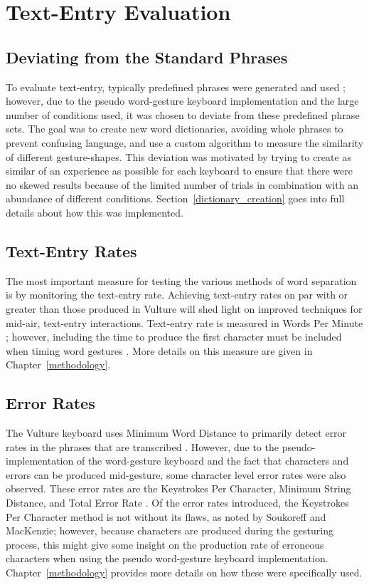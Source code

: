 \section{Text-Entry Evaluation}

\subsection{Deviating from the Standard Phrases}
To evaluate text-entry, typically predefined phrases were generated and used \cite{ref_phrase_sets}; however, due to the pseudo word-gesture keyboard implementation and the large number of conditions used, it was chosen to deviate from these predefined phrase sets. The goal was to create new word dictionaries, avoiding whole phrases to prevent confusing language, and use a custom algorithm to measure the similarity of different gesture-shapes. This deviation was motivated by trying to create as similar of an experience as possible for each keyboard to ensure that there were no skewed results because of the limited number of trials in combination with an abundance of different conditions. Section~\ref{dictionary_creation} goes into full details about how this was implemented.

\subsection{Text-Entry Rates}
The most important measure for testing the various methods of word separation is by monitoring the text-entry rate. Achieving text-entry rates on par with or greater than those produced in Vulture will shed light on improved techniques for mid-air, text-entry interactions. Text-entry rate is measured in Words Per Minute \cite{ref_wpm_word_gesture_formula}; however, including the time to produce the first character must be included when timing word gestures \cite{ref_wpm_word_gesture_timing}. More details on this measure are given in Chapter~\ref{methodology}.

\subsection{Error Rates}
The Vulture keyboard uses Minimum Word Distance to primarily detect error rates in the phrases that are transcribed \cite{ref_vulture}. However, due to the pseudo-implementation of the word-gesture keyboard and the fact that characters and errors can be produced mid-gesture, some character level error rates were also observed. These error rates are the Keystrokes Per Character, Minimum String Distance, and Total Error Rate \cite{ref_error_rates}. Of the error rates introduced, the Keystrokes Per Character method is not without its flaws, as noted by Soukoreff and MacKenzie; however, because characters are produced during the gesturing process, this might give some insight on the production rate of erroneous characters when using the pseudo word-gesture keyboard implementation. Chapter~\ref{methodology} provides more details on how these were specifically used.

